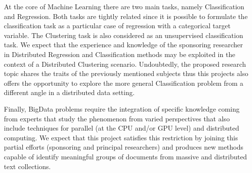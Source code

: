 \documentclass[10pt]{article}
\begin{document}

At the core of Machine Learning there are two main tasks, namely Classification and Regression. Both tasks are tightly related since it is possible to formulate the classification task as a particular case of regression with a categorical target variable. The Clustering task is also considered as an unsupervised classification task. We expect that the experience and knowledge of the sponsoring researcher in Distributed Regression and Classification methods may be exploited in the context of a Distributed Clustering scenario. 
Undoubtedly, the proposed research topic shares the traits of the previously mentioned subjects thus this projects also offers the opportunity to explore the more general Classification problem from a different angle in a distributed data setting. %

Finally, BigData problems require the integration of specific knowledge coming from experts that study the phenomenon from varied perspectives that also include techniques for parallel (at the CPU and/or GPU level) and distributed computing. We expect that this project satisfies this restriction by joining this partial efforts (sponsoring and principal researchers) and produces new methods capable of identify meaningful groups of documents from massive and distributed text collections.
\end{document}
